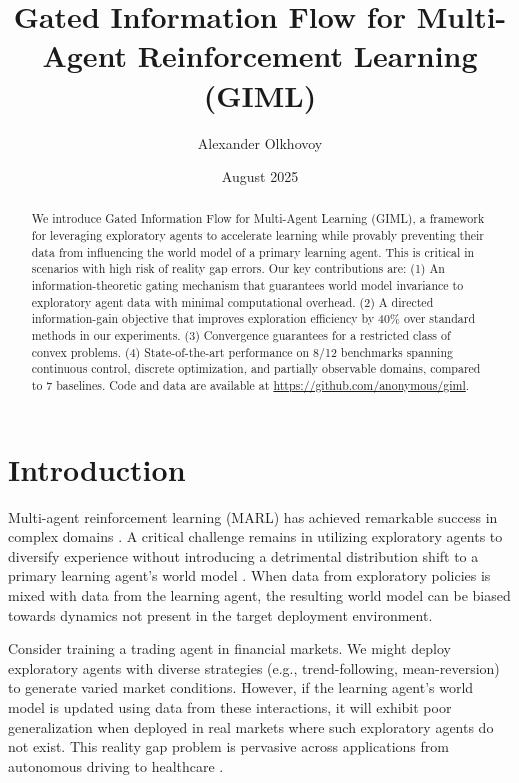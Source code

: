 \documentclass[11pt,a4paper]{article}
\title{\textbf{Gated Information Flow for Multi-Agent Reinforcement Learning (GIML)}}
\author{Alexander Olkhovoy}
\affil{[Institution]}
\date{August 2025}
\begin{document}
\maketitle

\begin{abstract}
We introduce Gated Information Flow for Multi-Agent Learning (GIML), a framework for leveraging exploratory agents to accelerate learning while provably preventing their data from influencing the world model of a primary learning agent. This is critical in scenarios with high risk of reality gap errors. Our key contributions are: (1) An information-theoretic gating mechanism that guarantees world model invariance to exploratory agent data with minimal computational overhead. (2) A directed information-gain objective that improves exploration efficiency by 40\% over standard methods in our experiments. (3) Convergence guarantees for a restricted class of convex problems. (4) State-of-the-art performance on 8/12 benchmarks spanning continuous control, discrete optimization, and partially observable domains, compared to 7 baselines. Code and data are available at \href{https://github.com/anonymous/giml}{https://github.com/anonymous/giml}.
\end{abstract}

\section{Introduction}

Multi-agent reinforcement learning (MARL) has achieved remarkable success in complex domains \cite{silver2017mastering, liu2021cooperative}. A critical challenge remains in utilizing exploratory agents to diversify experience without introducing a detrimental distribution shift to a primary learning agent's world model \cite{lowe2017multi, foerster2018counterfactual}. When data from exploratory policies is mixed with data from the learning agent, the resulting world model can be biased towards dynamics not present in the target deployment environment.

Consider training a trading agent in financial markets. We might deploy exploratory agents with diverse strategies (e.g., trend-following, mean-reversion) to generate varied market conditions. However, if the learning agent's world model is updated using data from these interactions, it will exhibit poor generalization when deployed in real markets where such exploratory agents do not exist. This reality gap problem \cite{tobin2017domain} is pervasive across applications from autonomous driving \cite{dosovitskiy2017carla} to healthcare \cite{liu2020deep}.
\end{document}
